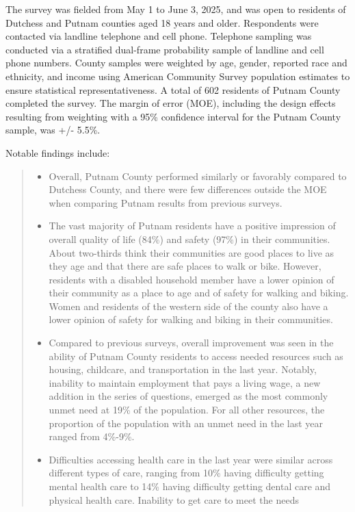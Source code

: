 \documentclass[
  english,
  letterpaper,
]{report}
\providecommand{\tightlist}{%
  \setlength{\itemsep}{0pt}\setlength{\parskip}{0pt}}
\begin{document}
The survey was fielded from May 1 to June 3, 2025, and was open to
residents of Dutchess and Putnam counties aged 18 years and older.
Respondents were contacted via landline telephone and cell phone.
Telephone sampling was conducted via a stratified dual-frame probability
sample of landline and cell phone numbers. County samples were weighted
by age, gender, reported race and ethnicity, and income using American
Community Survey population estimates to ensure statistical
representativeness. A total of 602 residents of Putnam County completed
the survey. The margin of error (MOE), including the design effects
resulting from weighting with a 95\% confidence interval for the Putnam
County sample, was +/- 5.5\%.

Notable findings include:

\begin{quote}
\begin{itemize}
\tightlist
\item
  Overall, Putnam County performed similarly or favorably compared to
  Dutchess County, and there were few differences outside the MOE when
  comparing Putnam results from previous surveys.
\item
  The vast majority of Putnam residents have a positive impression of
  overall quality of life (84\%) and safety (97\%) in their communities.
  About two-thirds think their communities are good places to live as
  they age and that there are safe places to walk or bike. However,
  residents with a disabled household member have a lower opinion of
  their community as a place to age and of safety for walking and
  biking. Women and residents of the western side of the county also
  have a lower opinion of safety for walking and biking in their
  communities.
\item
  Compared to previous surveys, overall improvement was seen in the
  ability of Putnam County residents to access needed resources such as
  housing, childcare, and transportation in the last year. Notably,
  inability to maintain employment that pays a living wage, a new
  addition in the series of questions, emerged as the most commonly
  unmet need at 19\% of the population. For all other resources, the
  proportion of the population with an unmet need in the last year
  ranged from 4\%-9\%.
\item
  Difficulties accessing health care in the last year were similar
  across different types of care, ranging from 10\% having difficulty
  getting mental health care to 14\% having difficulty getting dental
  care and physical health care. Inability to get care to meet the needs

\end{itemize}
\end{quote}
\end{document}
